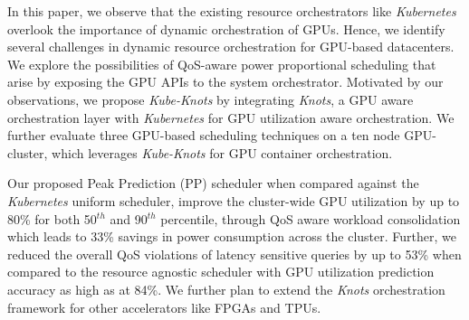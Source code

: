 In this paper, we observe that the existing resource orchestrators like \textit{Kubernetes} overlook the importance of dynamic orchestration of GPUs. Hence, we identify several challenges in dynamic resource orchestration for GPU-based datacenters.  We explore the possibilities of QoS-aware power proportional scheduling that arise by exposing the GPU APIs to the system orchestrator. Motivated by our observations, we propose \textit{Kube-Knots} by integrating \textit{Knots}, a GPU aware orchestration layer with \textit{Kubernetes} for GPU utilization aware orchestration. We further evaluate three GPU-based scheduling techniques on a ten node GPU-cluster, which leverages \textit{Kube-Knots} for GPU container orchestration.

Our proposed Peak Prediction (PP) scheduler when compared against the \textit{Kubernetes} uniform scheduler, improve the cluster-wide GPU utilization by up to 80\% for both 50$^{th}$ and 90$^{th}$ percentile, through QoS aware workload consolidation which leads to 33\% savings in power consumption across the cluster. Further, we reduced the overall QoS violations of latency sensitive queries by up to 53\% when compared to the resource agnostic scheduler with GPU utilization prediction accuracy as high as at 84\%. We further plan to extend the \textit{Knots} orchestration framework for other accelerators like FPGAs and TPUs.


